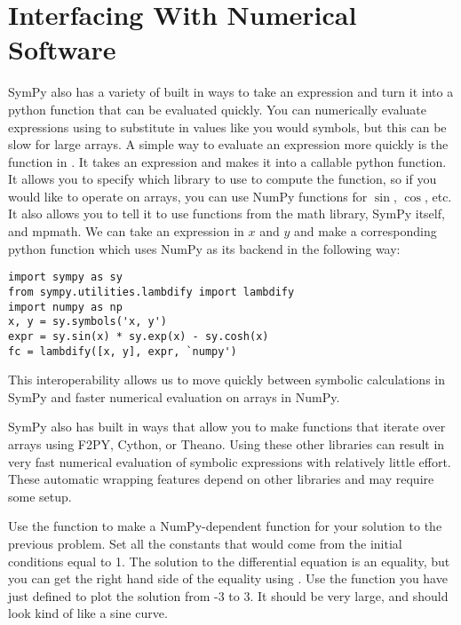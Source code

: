 \section*{Interfacing With Numerical Software}
SymPy also has a variety of built in ways to take an expression and turn it into a python function that can be evaluated quickly.
You can numerically evaluate expressions using  to substitute in values like you would symbols, but this can be slow for large arrays.
A simple way to evaluate an expression more quickly is the  function in .
It takes an expression and makes it into a callable python function.
It allows you to specify which library to use to compute the function, so if you would like to operate on arrays, you can use NumPy functions for $\sin$, $\cos$, etc.
It also allows you to tell it to use functions from the math library, SymPy itself, and mpmath.
We can take an expression in $x$ and $y$ and make a corresponding python function  which uses NumPy as its backend in the following way:
\begin{lstlisting}
import sympy as sy
from sympy.utilities.lambdify import lambdify
import numpy as np
x, y = sy.symbols('x, y')
expr = sy.sin(x) * sy.exp(x) - sy.cosh(x)
fc = lambdify([x, y], expr, `numpy')
\end{lstlisting}
This interoperability allows us to move quickly between symbolic calculations in SymPy and faster numerical evaluation on arrays in NumPy.

SymPy also has built in ways that allow you to make functions that iterate over arrays using F2PY, Cython, or Theano.
Using these other libraries can result in very fast numerical evaluation of symbolic expressions with relatively little effort.
These automatic wrapping features depend on other libraries and may require some setup.

\begin{problem}
Use the  function to make a NumPy-dependent function for your solution to the previous problem.
Set all the constants that would come from the initial conditions equal to 1.
The solution to the differential equation is an equality, but you can get the right hand side of the equality using .
Use the function you have just defined to plot the solution from -3 to 3.
It should be very large, and should look kind of like a sine curve.
\end{problem}
